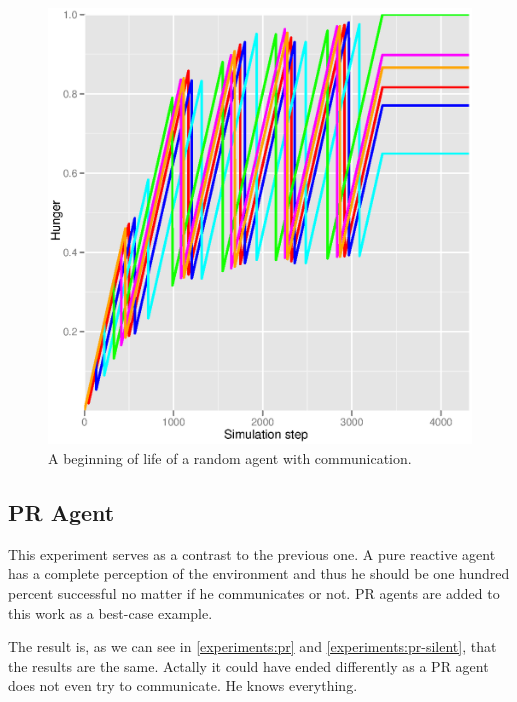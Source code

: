 
\begin{figure}[h!]
  \centering                                
  \includegraphics[scale=0.4]{diagrams/experiments/random_start.eps}    
  \caption{A beginning of life of a random agent with communication.}
  \label{experiments:random-start}
\end{figure}        

\clearpage

\subsection{PR Agent}

This experiment serves as a contrast to the previous one. A pure reactive agent has a complete perception of the environment and thus he should be one hundred percent successful no matter if he communicates or not. PR agents are added to this work as a best-case example.

The result is, as we can see in \ref{experiments:pr} and \ref{experiments:pr-silent}, that the results are the same. Actally it could have ended differently as a PR agent does not even try to communicate. He knows everything.

